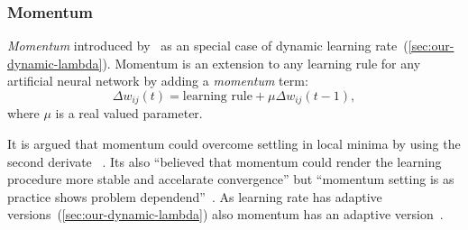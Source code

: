 \subsubsection{Momentum}
\label{sec:our-momentum}

\emph{Momentum} introduced by~\citet{jacobs1988increased} as an special case of dynamic learning rate~(\ref{sec:our-dynamic-lambda}). Momentum is an extension to any learning rule for any artificial neural network by adding a \emph{momentum} term: 
\begin{equation} 
  \Delta w_{ij}(t) = \mbox{learning rule} + \mu \Delta w_{ij}(t-1), \nonumber
\end{equation} 
where $\mu$ is a real valued parameter. 

It is argued that momentum could overcome settling in local minima by using the second derivate ~\citep{phansalkar1994analysis}. Its also \enquote{believed that momentum could render the learning procedure more stable and accelarate convergence} but \enquote{momentum setting is as practice shows problem dependend}~\citep{riedmiller1993direct}. As learning rate has adaptive versions~(\ref{sec:our-dynamic-lambda}) also momentum has an adaptive version~\citep{miniani1990acceleration}. 
